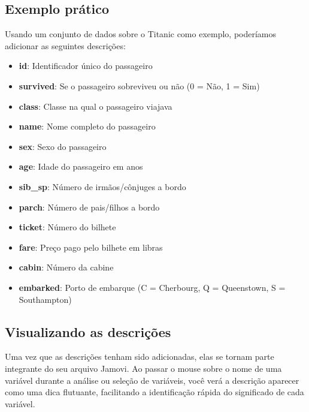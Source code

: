 \subsection{Exemplo prático}

Usando um conjunto de dados sobre o Titanic como exemplo, poderíamos adicionar as seguintes descrições:

\begin{itemize}
    \item \textbf{id}: Identificador único do passageiro
    \item \textbf{survived}: Se o passageiro sobreviveu ou não (0 = Não, 1 = Sim)
    \item \textbf{class}: Classe na qual o passageiro viajava
    \item \textbf{name}: Nome completo do passageiro
    \item \textbf{sex}: Sexo do passageiro
    \item \textbf{age}: Idade do passageiro em anos
    \item \textbf{sib\_sp}: Número de irmãos/cônjuges a bordo
    \item \textbf{parch}: Número de pais/filhos a bordo
    \item \textbf{ticket}: Número do bilhete
    \item \textbf{fare}: Preço pago pelo bilhete em libras
    \item \textbf{cabin}: Número da cabine
    \item \textbf{embarked}: Porto de embarque (C = Cherbourg, Q = Queenstown, S = Southampton)
\end{itemize}


\subsection{Visualizando as descrições}

Uma vez que as descrições tenham sido adicionadas, elas se tornam parte integrante do seu arquivo Jamovi. Ao passar o mouse sobre o nome de uma variável durante a análise ou seleção de variáveis, você verá a descrição aparecer como uma dica flutuante, facilitando a identificação rápida do significado de cada variável.

